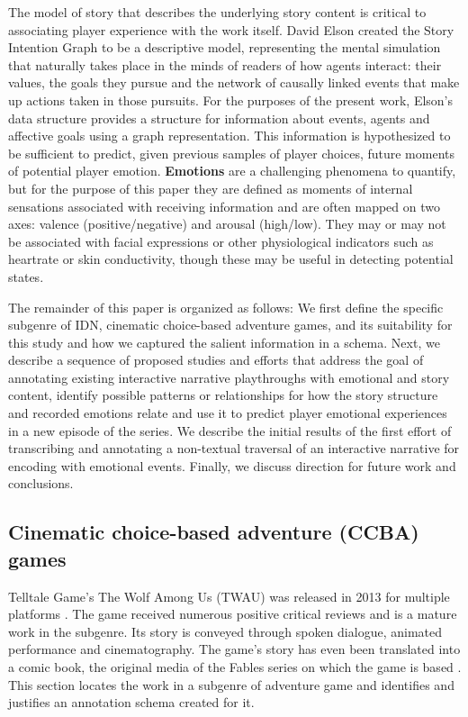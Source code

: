 The model of story that describes the underlying story content is
critical to associating player experience with the work itself. David
Elson created the Story Intention Graph to be a descriptive model,
representing the mental simulation that naturally takes place in the
minds of readers of how agents interact: their values, the goals they
pursue and the network of causally linked events that make up actions
taken in those pursuits. For the purposes of the present work, Elson's
data structure provides a structure for information about events,
agents and affective goals using a graph representation. This
information is hypothesized to be sufficient to predict, given
previous samples of player choices, future moments of potential player
emotion. \textbf{Emotions} are a challenging phenomena to quantify, but for
the purpose of this paper they are defined as moments of internal
sensations associated with receiving information and are often mapped
on two axes: valence (positive/negative) and arousal (high/low). They
may or may not be associated with facial expressions or other
physiological indicators such as heartrate or skin conductivity,
though these may be useful in detecting potential states.

The remainder of this paper is organized as follows: We first define
the specific subgenre of IDN, cinematic choice-based
adventure games, and its suitability for this study and how we
captured the salient information in a schema. Next, we describe a
sequence of proposed studies and efforts that address the goal of
annotating existing interactive narrative playthroughs with emotional
and story content, identify possible patterns or relationships for how
the story structure and recorded emotions relate and use it to predict
player emotional experiences in a new episode of the series. We
describe the initial results of the first effort of transcribing and
annotating a non-textual traversal of an interactive narrative for
encoding with emotional events. Finally, we discuss direction for
future work and conclusions.

\subsection{Cinematic choice-based adventure (CCBA) games}
\label{sec:orgheadline2}
Telltale Game's The Wolf Among Us (TWAU) was released in 2013 for
multiple platforms \cite{Telltale_Games2013-hz}. The game received
numerous positive critical reviews and is a mature work in the
subgenre. Its story is conveyed through spoken dialogue, animated
performance and cinematography. The game's story has even been
translated into a comic book, the original media of the Fables series
on which the game is based \cite{Sturges2014-ua}. This section locates
the work in a subgenre of adventure game and identifies and justifies
an annotation schema created for it.

